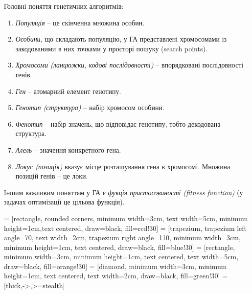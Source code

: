 Головні поняття генетичних алгоритмів:
\begin{enumerate}
    \item \emph{Популяція} -- це скінченна множина особин.
    \item \emph{Особини}, що складають популяцію, у ГА представлені хромосомами із закодованими в них
    точками у просторі пошуку (search points).
    \item \emph{Хромосоми (ланцюжки, кодові послідовності)} -- впорядковані послідовності генів.
    \item \emph{Ген} -- атомарний елемент генотипу.
    \item \emph{Генотип (структура)} -- набір хромосом особини.
    \item \emph{Фенотип} -- набір значень, що відповідає генотипу, тобто декодована структура.
    \item \emph{Алель} -- значення конкретного гена.
    \item \emph{Локус (позиція)} вказує місце розташування гена в хромосомі.
    Множина позицій генів -- це локи.
\end{enumerate}

Іншим важливим поняттям у ГА є \emph{фукція пристосованості (fitness function)}
(у задачах оптимізації це цільова функція).

\usetikzlibrary{shapes.geometric, arrows}
 = [rectangle, rounded corners, minimum width=3cm, text width=5cm, minimum height=1cm,text centered, draw=black, fill=red!30]
 = [trapezium, trapezium left angle=70, text width=2cm, trapezium right angle=110, minimum width=3cm, minimum height=1cm, text centered, draw=black, fill=blue!30]
 = [rectangle, minimum width=3cm, minimum height=1cm, text centered, text width=5cm, draw=black, fill=orange!30]
 = [diamond, minimum width=3cm, minimum height=1cm, text centered, text width=2cm, draw=black, fill=green!30]
 = [thick,->,>=stealth]

